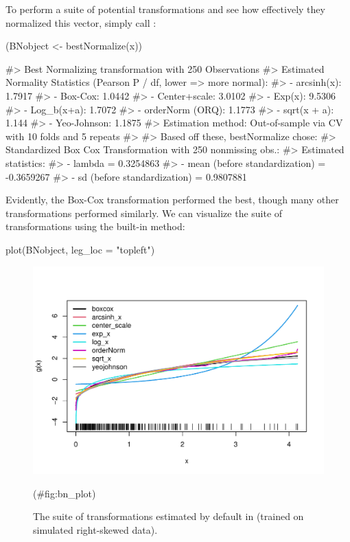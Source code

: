 To perform a suite of potential transformations and see how effectively
they normalized this vector, simply call :

\begin{Schunk}
\begin{Sinput}
(BNobject <- bestNormalize(x))
\end{Sinput}
\begin{Soutput}
#> Best Normalizing transformation with 250 Observations
#>  Estimated Normality Statistics (Pearson P / df, lower => more normal):
#>  - arcsinh(x): 1.7917
#>  - Box-Cox: 1.0442
#>  - Center+scale: 3.0102
#>  - Exp(x): 9.5306
#>  - Log_b(x+a): 1.7072
#>  - orderNorm (ORQ): 1.1773
#>  - sqrt(x + a): 1.144
#>  - Yeo-Johnson: 1.1875
#> Estimation method: Out-of-sample via CV with 10 folds and 5 repeats
#>  
#> Based off these, bestNormalize chose:
#> Standardized Box Cox Transformation with 250 nonmissing obs.:
#>  Estimated statistics:
#>  - lambda = 0.3254863 
#>  - mean (before standardization) = -0.3659267 
#>  - sd (before standardization) = 0.9807881
\end{Soutput}
\end{Schunk}

Evidently, the Box-Cox transformation performed the best, though many
other transformations performed similarly. We can visualize the suite of
transformations using the built-in  method:

\begin{Schunk}
\begin{Sinput}
plot(BNobject, leg_loc = "topleft")
\end{Sinput}
\begin{figure}

{\centering \includegraphics[width=1\linewidth]{figs/bn_plot-1} 

}

\caption[The suite of transformations estimated by default in  (trained on simulated right-skewed data)]{The suite of transformations estimated by default in  (trained on simulated right-skewed data).}(\#fig:bn_plot)
\end{figure}
\end{Schunk}

